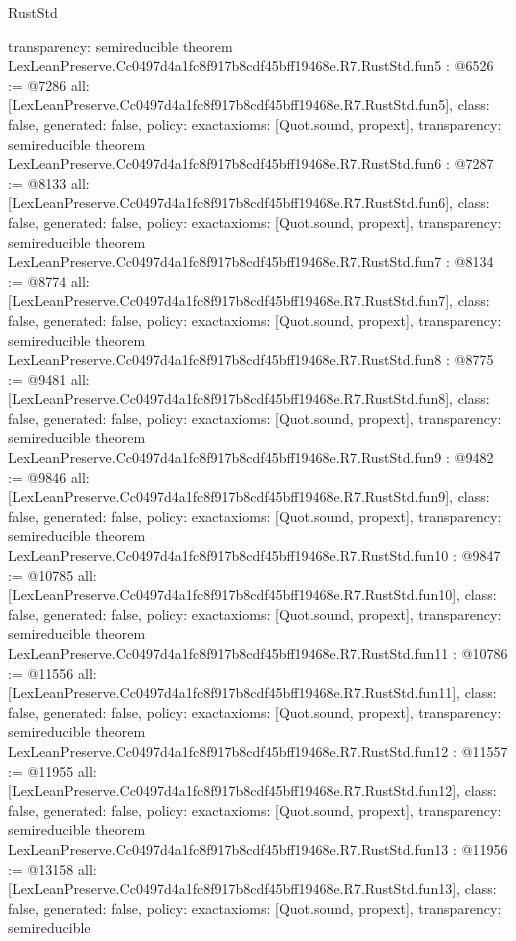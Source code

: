 \begin{lexlean}{RustStd}
\begin{coremodule}
{  transparency: semireducible
}
theorem LexLeanPreserve.Cc0497d4a1fc8f917b8cdf45bff19468e.R7.RustStd.fun5 : @6526 := @7286 {
  all: [LexLeanPreserve.Cc0497d4a1fc8f917b8cdf45bff19468e.R7.RustStd.fun5],
  class: false,
  generated: false,
  policy: exact{axioms: [Quot.sound, propext]},
  transparency: semireducible
}
theorem LexLeanPreserve.Cc0497d4a1fc8f917b8cdf45bff19468e.R7.RustStd.fun6 : @7287 := @8133 {
  all: [LexLeanPreserve.Cc0497d4a1fc8f917b8cdf45bff19468e.R7.RustStd.fun6],
  class: false,
  generated: false,
  policy: exact{axioms: [Quot.sound, propext]},
  transparency: semireducible
}
theorem LexLeanPreserve.Cc0497d4a1fc8f917b8cdf45bff19468e.R7.RustStd.fun7 : @8134 := @8774 {
  all: [LexLeanPreserve.Cc0497d4a1fc8f917b8cdf45bff19468e.R7.RustStd.fun7],
  class: false,
  generated: false,
  policy: exact{axioms: [Quot.sound, propext]},
  transparency: semireducible
}
theorem LexLeanPreserve.Cc0497d4a1fc8f917b8cdf45bff19468e.R7.RustStd.fun8 : @8775 := @9481 {
  all: [LexLeanPreserve.Cc0497d4a1fc8f917b8cdf45bff19468e.R7.RustStd.fun8],
  class: false,
  generated: false,
  policy: exact{axioms: [Quot.sound, propext]},
  transparency: semireducible
}
theorem LexLeanPreserve.Cc0497d4a1fc8f917b8cdf45bff19468e.R7.RustStd.fun9 : @9482 := @9846 {
  all: [LexLeanPreserve.Cc0497d4a1fc8f917b8cdf45bff19468e.R7.RustStd.fun9],
  class: false,
  generated: false,
  policy: exact{axioms: [Quot.sound, propext]},
  transparency: semireducible
}
theorem LexLeanPreserve.Cc0497d4a1fc8f917b8cdf45bff19468e.R7.RustStd.fun10 : @9847 := @10785 {
  all: [LexLeanPreserve.Cc0497d4a1fc8f917b8cdf45bff19468e.R7.RustStd.fun10],
  class: false,
  generated: false,
  policy: exact{axioms: [Quot.sound, propext]},
  transparency: semireducible
}
theorem LexLeanPreserve.Cc0497d4a1fc8f917b8cdf45bff19468e.R7.RustStd.fun11 : @10786 := @11556 {
  all: [LexLeanPreserve.Cc0497d4a1fc8f917b8cdf45bff19468e.R7.RustStd.fun11],
  class: false,
  generated: false,
  policy: exact{axioms: [Quot.sound, propext]},
  transparency: semireducible
}
theorem LexLeanPreserve.Cc0497d4a1fc8f917b8cdf45bff19468e.R7.RustStd.fun12 : @11557 := @11955 {
  all: [LexLeanPreserve.Cc0497d4a1fc8f917b8cdf45bff19468e.R7.RustStd.fun12],
  class: false,
  generated: false,
  policy: exact{axioms: [Quot.sound, propext]},
  transparency: semireducible
}
theorem LexLeanPreserve.Cc0497d4a1fc8f917b8cdf45bff19468e.R7.RustStd.fun13 : @11956 := @13158 {
  all: [LexLeanPreserve.Cc0497d4a1fc8f917b8cdf45bff19468e.R7.RustStd.fun13],
  class: false,
  generated: false,
  policy: exact{axioms: [Quot.sound, propext]},
  transparency: semireducible
}
\end{coremodule}
\end{lexlean}
